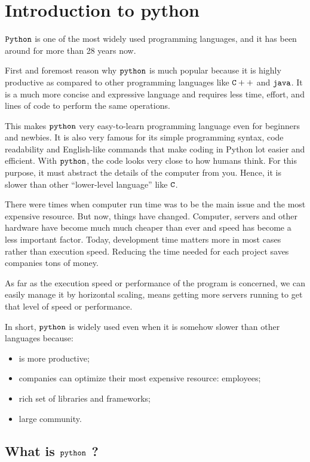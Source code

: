 \chapter{Introduction to python}\label{introduction-to-python---lesson-1}

$\tt{Python}$ is one of the most widely used programming languages, and it has been around for more than 28 years now. 

First and foremost reason why $\tt{python}$ is much popular because it is highly productive as compared to other programming languages like $\tt{C++}$ and $\tt{java}$. It is a much more concise and expressive language and requires less time, effort, and lines of code to perform the same operations.

This makes $\tt{python}$ very easy-to-learn programming language even for beginners and newbies. It is also very famous for its simple programming syntax, code readability and English-like commands that make coding in Python lot easier and efficient.
With $\tt{python}$, the code looks very close to how humans think. For this purpose, it must abstract the details of the computer from you. Hence, it is slower than other “lower-level language” like $\tt{C}$.

There were times when computer run time was to be the main issue and the most expensive resource. But now, things have changed. Computer, servers and other hardware have become much much cheaper than ever and speed has become a less important factor. Today, development time matters more in most cases rather than execution speed. Reducing the time needed for each project saves companies tons of money.

As far as the execution speed or performance of the program is concerned, we can easily manage it by horizontal scaling, means getting more servers running to get that level of speed or performance.

In short, $\tt{python}$ is widely used even when it is somehow slower than other languages because:
\begin{itemize}
  \item is more productive;
  \item companies can optimize their most expensive resource: employees;
  \item rich set of libraries and frameworks;
  \item large community.
\end{itemize}

\section{What is $\tt{python}$ ?}\label{what-is-python}

